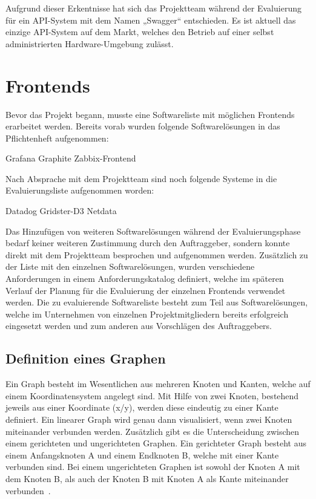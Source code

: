 Aufgrund dieser Erkentnisse hat sich das Projektteam während der Evaluierung
für ein API-System mit dem Namen „Swagger“ entschieden. Es ist aktuell das
einzige API-System auf dem Markt, welches den Betrieb auf einer selbst
administrierten Hardware-Umgebung zulässt.
\nl%

\section{Frontends}
\label{sec:frontends}
Bevor das Projekt begann, musste eine Softwareliste mit möglichen Frontends
erarbeitet werden. Bereits vorab wurden folgende Softwarelösungen in das
Pflichtenheft aufgenommen:

\begin{outline}
  \1 Grafana
  \1 Graphite
  \1 Zabbix-Frontend
\end{outline}

Nach Absprache mit dem Projektteam sind noch folgende Systeme in die
Evaluierungsliste aufgenommen worden:

\begin{outline}
  \1 Datadog
  \1 Gridster-D3
  \1 Netdata
\end{outline}

Das Hinzufügen von weiteren Softwarelösungen während der Evaluierungsphase
bedarf keiner weiteren Zustimmung durch den Auftraggeber, sondern konnte direkt
mit dem Projektteam besprochen und aufgenommen werden. Zusätzlich zu der Liste
mit den einzelnen Softwarelösungen, wurden verschiedene Anforderungen in einem
Anforderungskatalog definiert, welche im späteren Verlauf der Planung für die
Evaluierung der einzelnen Frontends verwendet werden. Die zu evaluierende
Softwareliste besteht zum Teil aus Softwarelösungen, welche im Unternehmen von
einzelnen Projektmitgliedern bereits erfolgreich eingesetzt werden und zum
anderen aus Vorschlägen des Auftraggebers.
\mr%

\subsection{Definition eines Graphen}
\label{definition_eines_graphen}
Ein Graph besteht im Wesentlichen aus mehreren Knoten und Kanten, welche auf
einem Koordinatensystem angelegt sind. Mit Hilfe von zwei Knoten, bestehend
jeweils aus einer Koordinate (x/y), werden diese eindeutig zu einer Kante
definiert. Ein linearer Graph wird genau dann visualisiert, wenn zwei Knoten
miteinander verbunden werden. Zusätzlich gibt es die Unterscheidung zwischen
einem gerichteten und ungerichteten Graphen. Ein gerichteter Graph besteht aus
einem Anfangsknoten A und einem Endknoten B, welche mit einer Kante verbunden
sind. Bei einem ungerichteten Graphen ist sowohl der Knoten A mit dem Knoten B,
als auch der Knoten B mit Knoten A als Kante miteinander
verbunden~\cite{kaiser2008c}.

